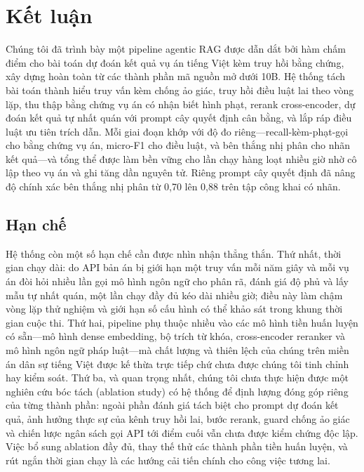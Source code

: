 \documentclass[conference]{IEEEtran}
\begin{document}
\section{Kết luận}
Chúng tôi đã trình bày một pipeline agentic RAG được dẫn dắt bởi hàm chấm điểm cho bài toán dự đoán kết quả vụ án tiếng Việt kèm truy hồi bằng chứng, xây dựng hoàn toàn từ các thành phần mã nguồn mở dưới 10B. Hệ thống tách bài toán thành hiểu truy vấn kèm chống ảo giác, truy hồi điều luật lai theo vòng lặp, thu thập bằng chứng vụ án có nhận biết hình phạt, rerank cross-encoder, dự đoán kết quả tự nhất quán với prompt cây quyết định cân bằng, và lắp ráp điều luật ưu tiên trích dẫn. Mỗi giai đoạn khớp với độ đo riêng---recall-kèm-phạt-gọi cho bằng chứng vụ án, micro-F1 cho điều luật, và bên thắng nhị phân cho nhãn kết quả---và tổng thể được làm bền vững cho lần chạy hàng loạt nhiều giờ nhờ cô lập theo vụ án và ghi tăng dần nguyên tử. Riêng prompt cây quyết định đã nâng độ chính xác bên thắng nhị phân từ 0,70 lên 0,88 trên tập công khai có nhãn.

\subsection{Hạn chế}
Hệ thống còn một số hạn chế cần được nhìn nhận thẳng thắn. Thứ nhất, thời gian
chạy dài: do API bản án bị giới hạn một truy vấn mỗi năm giây và mỗi vụ án đòi
hỏi nhiều lần gọi mô hình ngôn ngữ cho phân rã, đánh giá độ phủ và lấy mẫu tự
nhất quán, một lần chạy đầy đủ kéo dài nhiều giờ; điều này làm chậm vòng lặp thử
nghiệm và giới hạn số cấu hình có thể khảo sát trong khung thời gian cuộc thi.
Thứ hai, pipeline phụ thuộc nhiều vào các mô hình tiền huấn luyện có sẵn---mô
hình dense embedding, bộ trích từ khóa, cross-encoder reranker và mô hình ngôn
ngữ pháp luật---mà chất lượng và thiên lệch của chúng trên miền án dân sự tiếng
Việt được kế thừa trực tiếp chứ chưa được chúng tôi tinh chỉnh hay kiểm soát.
Thứ ba, và quan trọng nhất, chúng tôi chưa thực hiện được một nghiên cứu bóc tách
(ablation study) có hệ thống để định lượng đóng góp riêng của từng thành phần:
ngoài phần đánh giá tách biệt cho prompt dự đoán kết quả, ảnh hưởng thực sự của
kênh truy hồi lai, bước rerank, guard chống ảo giác và chiến lược ngân sách gọi
API tới điểm cuối vẫn chưa được kiểm chứng độc lập. Việc bổ sung ablation đầy đủ,
thay thế thử các thành phần tiền huấn luyện, và rút ngắn thời gian chạy là các
hướng cải tiến chính cho công việc tương lai.
\end{document}
